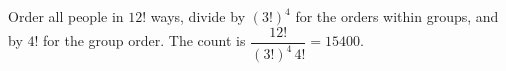Order all people in $12!$ ways, divide by $(3!)^4$ for the orders within groups, and by $4!$ for the group order. The count is $\boxed{\dfrac{12!}{(3!)^4\,4!}=15400}$.
